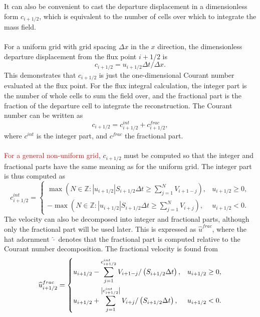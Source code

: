 \documentclass{ametsocV6.1}
\newcommand{\change}[1]{\textcolor{red}{#1}}
\begin{document}
It can also be convenient to cast the departure displacement in a dimensionless form $c_{i+1/2}$, which is equivalent to the number of cells over which to integrate the mass field. \\
\\
For a uniform grid with grid spacing $\Delta x$ in the $x$ direction, the dimensionless departure displacement from the flux point $i+1/2$ is
\begin{equation}
c_{i+1/2} = u_{i+1/2} \Delta{t} / \Delta{x}.
\end{equation}
This demonstrates that $c_{i+1/2}$ is just the one-dimensional Courant number evaluated at the flux point.
For the flux integral calculation, the integer part is the number of whole cells to sum the field over, and the fractional part is the fraction of the departure cell to integrate the reconstruction. The Courant number can be written as
\begin{equation}
c_{i+1/2} = c^{int}_{i+1/2} + c^{frac}_{i+1/2},
\end{equation}
where $c^{int}$ is the integer part, and $c^{frac}$ the fractional part. \\
\\
\change{For a general non-uniform grid}, $c_{i+1/2}$ must be computed so that the integer and fractional parts have the same meaning as for the uniform grid.
The integer part is thus computed as
\begin{equation} \label{eqn:int_courant}
c^{int}_{i+1/2} = 
\begin{cases}
\max\left(N\in\mathbb{Z} : |u_{i+1/2}| S_{i+1/2}\Delta t \geq\sum_{j=1}^N V_{i+1-j} \right), & u_{i+1/2} \geq 0, \\
-\max\left(N\in\mathbb{Z} : |u_{i+1/2}| S_{i+1/2} \Delta t \geq\sum_{j=1}^N V_{i+j} \right), & u_{i+1/2} < 0.
\end{cases}
\end{equation}
The velocity can also be decomposed into integer and fractional parts, although only the fractional part will be used later.
This is expressed as $\widehat{u}^{frac}$, where the hat adornment $\widehat{\cdot}$ denotes that the fractional part is computed relative to the Courant number decomposition.
The fractional velocity is found from
\begin{equation} \label{eqn:frac_wind}
\widehat{u}^{frac}_{i+1/2} = 
\begin{dcases}
u_{i+1/2}-\sum_{j=1}^{c^{int}_{i+1/2}} V_{i+1-j} / \left(S_{i+1/2}\Delta t\right), & u_{i+1/2} \geq 0, \\
u_{i+1/2}+\sum_{j=1}^{\left|c^{int}_{i+1/2}\right|} V_{i+j} / \left(S_{i+1/2}\Delta t\right), & u_{i+1/2} < 0.
\end{dcases}
\end{equation}
\end{document}
